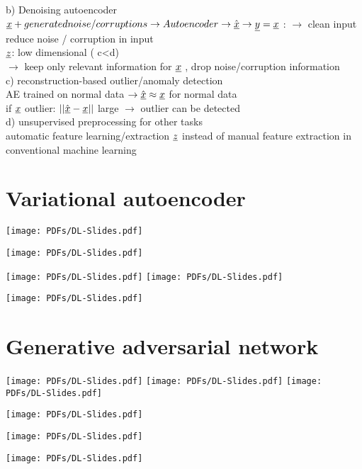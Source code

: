 \textbullet b) Denoising autoencoder \\
$ {\underline x} + generated noise / corruptions \rightarrow Autoencoder \rightarrow \hat{{\underline x}}\rightarrow {\underline y} = {\underline x}  $ : $ \rightarrow $ clean input \\
reduce noise / corruption in input\\
$  {\underline z}  $: low dimensional ( c<d) \\
$ \rightarrow $ keep only relevant information for $ {\underline x} $ , drop noise/corruption information\\
 c) reconstruction-based outlier/anomaly detection\\
\textbullet AE trained on normal data $ \rightarrow  \hat{{\underline x}} \approx {\underline x} $ for normal data \\
\textbullet if $  {\underline x} $ outlier:  $  || \hat{{\underline x}} - {\underline x} || $ large $ \rightarrow $ outlier can be detected \\
 d) unsupervised preprocessing for other tasks\\
 \textbullet automatic feature learning/extraction $  {\underline z} $ instead of manual feature extraction in conventional machine learning\\


\section{Variational autoencoder}
\texttt{[image: PDFs/DL-Slides.pdf]}

\texttt{[image: PDFs/DL-Slides.pdf]}

\texttt{[image: PDFs/DL-Slides.pdf]}
\texttt{[image: PDFs/DL-Slides.pdf]}

\texttt{[image: PDFs/DL-Slides.pdf]}
\section{Generative adversarial network}
\texttt{[image: PDFs/DL-Slides.pdf]}
\newpage
\texttt{[image: PDFs/DL-Slides.pdf]}
\texttt{[image: PDFs/DL-Slides.pdf]}

\texttt{[image: PDFs/DL-Slides.pdf]}


\texttt{[image: PDFs/DL-Slides.pdf]}

\texttt{[image: PDFs/DL-Slides.pdf]}
